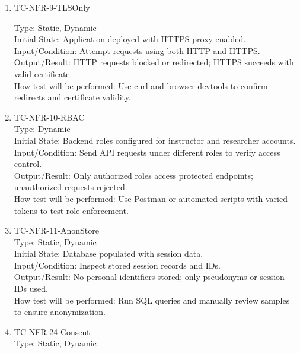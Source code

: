 \documentclass[12pt, titlepage]{article}
\begin{document}
\begin{enumerate}
\item{TC-NFR-9-TLSOnly\\}

Type: Static, Dynamic\\

Initial State: Application deployed with HTTPS proxy enabled.\\

Input/Condition: Attempt requests using both HTTP and HTTPS.\\

Output/Result: HTTP requests blocked or redirected; HTTPS succeeds with valid certificate.\\

How test will be performed: Use curl and browser devtools to confirm redirects and certificate validity.

\item{TC-NFR-10-RBAC\\}
Type: Dynamic\\

Initial State: Backend roles configured for instructor and researcher accounts.\\

Input/Condition: Send API requests under different roles to verify access control.\\

Output/Result: Only authorized roles access protected endpoints; unauthorized requests rejected.\\

How test will be performed: Use Postman or automated scripts with varied tokens to test role enforcement.

\item{TC-NFR-11-AnonStore\\}
Type: Static, Dynamic\\

Initial State: Database populated with session data.\\

Input/Condition: Inspect stored session records and IDs.\\

Output/Result: No personal identifiers stored; only pseudonyms or session IDs used.\\

How test will be performed: Run SQL queries and manually review samples to ensure anonymization.

\item{TC-NFR-24-Consent\\}
Type: Static, Dynamic\\


\end{enumerate}
\end{document}

